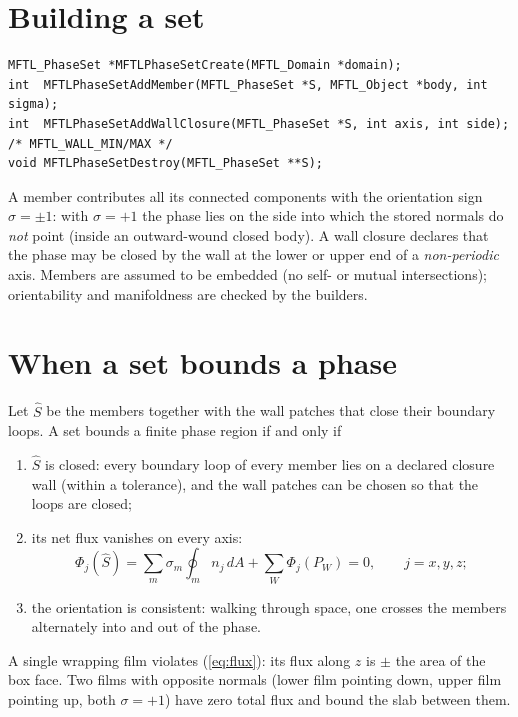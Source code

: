 \section{Building a set}

\begin{lstlisting}[numbers=none]
MFTL_PhaseSet *MFTLPhaseSetCreate(MFTL_Domain *domain);
int  MFTLPhaseSetAddMember(MFTL_PhaseSet *S, MFTL_Object *body, int sigma);
int  MFTLPhaseSetAddWallClosure(MFTL_PhaseSet *S, int axis, int side); /* MFTL_WALL_MIN/MAX */
void MFTLPhaseSetDestroy(MFTL_PhaseSet **S);
\end{lstlisting}
A member contributes all its connected components with the orientation sign
$\sigma=\pm1$: with $\sigma=+1$ the phase lies on the side into which the stored normals do
\emph{not} point (inside an outward-wound closed body). A wall closure declares that the phase
may be closed by the wall at the lower or upper end of a \emph{non-periodic} axis. Members are
assumed to be embedded (no self- or mutual intersections); orientability and manifoldness are
checked by the builders.

\section{When a set bounds a phase}

Let $\hat S$ be the members together with the wall patches that close their boundary loops. A
set bounds a finite phase region if and only if
\begin{enumerate}
  \item $\hat S$ is closed: every boundary loop of every member lies on a declared closure wall
    (within a tolerance), and the wall patches can be chosen so that the loops are closed;
  \item its net flux vanishes on every axis:
    \begin{equation}
      \Phi_j(\hat S) = \sum_m \sigma_m \oint_m n_j\,dA + \sum_W \Phi_j(P_W) = 0,\qquad j=x,y,z;
      \label{eq:flux}
    \end{equation}
  \item the orientation is consistent: walking through space, one crosses the members
    alternately into and out of the phase.
\end{enumerate}
A single wrapping film violates (\ref{eq:flux}): its flux along $z$ is $\pm$ the area of the box
face. Two films with opposite normals (lower film pointing down, upper film pointing up, both
$\sigma=+1$) have zero total flux and bound the slab between them.

